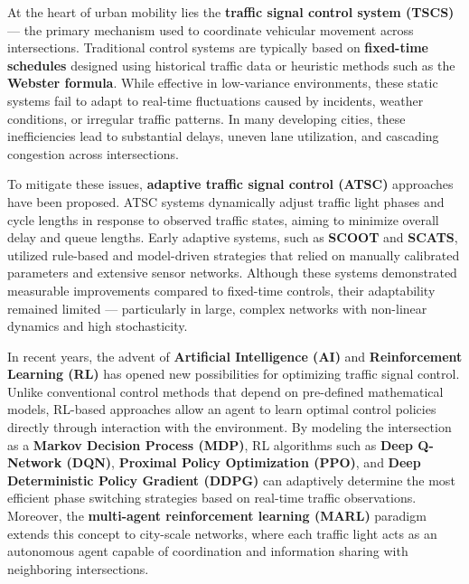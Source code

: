 \documentclass[12pt]{report} %
\begin{document}
At the heart of urban mobility lies the \textbf{traffic signal control system (TSCS)} --- the primary mechanism used to coordinate vehicular movement across intersections. Traditional control systems are typically based on \textbf{fixed-time schedules} designed using historical traffic data or heuristic methods such as the \textbf{Webster formula}. While effective in low-variance environments, these static systems fail to adapt to real-time fluctuations caused by incidents, weather conditions, or irregular traffic patterns. In many developing cities, these inefficiencies lead to substantial delays, uneven lane utilization, and cascading congestion across intersections.

To mitigate these issues, \textbf{adaptive traffic signal control (ATSC)} approaches have been proposed. ATSC systems dynamically adjust traffic light phases and cycle lengths in response to observed traffic states, aiming to minimize overall delay and queue lengths. Early adaptive systems, such as \textbf{SCOOT} and \textbf{SCATS}, utilized rule-based and model-driven strategies that relied on manually calibrated parameters and extensive sensor networks. Although these systems demonstrated measurable improvements compared to fixed-time controls, their adaptability remained limited --- particularly in large, complex networks with non-linear dynamics and high stochasticity.

In recent years, the advent of \textbf{Artificial Intelligence (AI)} and \textbf{Reinforcement Learning (RL)} has opened new possibilities for optimizing traffic signal control. Unlike conventional control methods that depend on pre-defined mathematical models, RL-based approaches allow an agent to learn optimal control policies directly through interaction with the environment. By modeling the intersection as a \textbf{Markov Decision Process (MDP)}, RL algorithms such as \textbf{Deep Q-Network (DQN)}, \textbf{Proximal Policy Optimization (PPO)}, and \textbf{Deep Deterministic Policy Gradient (DDPG)} can adaptively determine the most efficient phase switching strategies based on real-time traffic observations. Moreover, the \textbf{multi-agent reinforcement learning (MARL)} paradigm extends this concept to city-scale networks, where each traffic light acts as an autonomous agent capable of coordination and information sharing with neighboring intersections.
\end{document}
